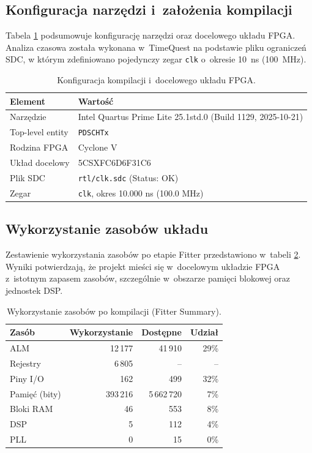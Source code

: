 \subsection{Konfiguracja narzędzi i~założenia kompilacji}
\label{subsec:setup_quartus}

Tabela \ref{tab:impl_setup} podsumowuje konfigurację narzędzi oraz docelowego układu FPGA.
Analiza czasowa została wykonana w~TimeQuest na podstawie pliku ograniczeń SDC,
w którym zdefiniowano pojedynczy zegar \texttt{clk} o~okresie 10~ns (100~MHz).

\begin{table}[!ht]
\centering
\caption{Konfiguracja kompilacji i~docelowego układu FPGA.}
\label{tab:impl_setup}
\begin{tabular}{ll}
\hline
Element & Wartość \\
\hline
Narzędzie & Intel Quartus Prime Lite 25.1std.0 (Build 1129, 2025-10-21) \\
Top-level entity & \texttt{PDSCHTx} \\
Rodzina FPGA & Cyclone V \\
Układ docelowy & 5CSXFC6D6F31C6 \\
Plik SDC & \texttt{rtl/clk.sdc} (Status: OK) \\
Zegar & \texttt{clk}, okres 10.000 ns (100.0 MHz) \\
\hline
\end{tabular}
\end{table}

\subsection{Wykorzystanie zasobów układu}
\label{subsec:resource_usage}

Zestawienie wykorzystania zasobów po etapie Fitter przedstawiono w~tabeli \ref{tab:resource_usage}.
Wyniki potwierdzają, że projekt mieści się w~docelowym układzie FPGA z~istotnym zapasem zasobów,
szczególnie w~obszarze pamięci blokowej oraz jednostek DSP.

\begin{table}[!ht]
\centering
\caption{Wykorzystanie zasobów po kompilacji (Fitter Summary).}
\label{tab:resource_usage}
\begin{tabular}{lrrr}
\hline
Zasób & Wykorzystanie & Dostępne & Udział \\
\hline
ALM & 12\,177 & 41\,910 & 29\% \\
Rejestry & 6\,805 & -- & -- \\
Piny I/O & 162 & 499 & 32\% \\
Pamięć (bity) & 393\,216 & 5\,662\,720 & 7\% \\
Bloki RAM & 46 & 553 & 8\% \\
DSP & 5 & 112 & 4\% \\
PLL & 0 & 15 & 0\% \\
\hline
\end{tabular}
\end{table}

